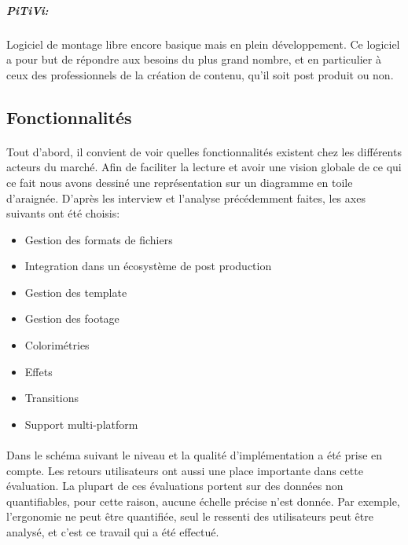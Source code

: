 \subparagraph{PiTiVi:}

Logiciel de montage libre encore basique mais en plein développement.
Ce logiciel a pour but de répondre aux besoins du plus grand nombre,
et en particulier à ceux des professionnels de la création de contenu,
qu'il soit post produit ou non.


\subsection{Fonctionnalités}

\paragraph{}

Tout d'abord, il convient de voir quelles fonctionnalités existent
chez les différents acteurs du marché. Afin de faciliter la lecture
et avoir une vision globale de ce qui ce fait nous avons dessiné une
représentation sur un diagramme en toile d'araignée.  D'après les
interview et l'analyse précédemment faites, les axes suivants ont
été choisis:

\begin{itemize} \setlength{\itemsep}{2mm}

  \item{Gestion des formats de fichiers}

  \item{Integration dans un écosystème de post production}

  \item{Gestion des template}

  \item{Gestion des footage}

  \item{Colorimétries}

  \item{Effets}

  \item{Transitions}

  \item{Support multi-platform}

\end {itemize}

\paragraph{}

Dans le schéma suivant le niveau et la qualité
d'implémentation a été prise en compte. Les retours utilisateurs
ont aussi une place importante dans cette évaluation. La plupart de
ces évaluations portent sur des données non quantifiables, pour cette
raison, aucune échelle précise n'est donnée.  Par exemple, l'ergonomie
ne peut être quantifiée, seul le ressenti des utilisateurs peut être
analysé, et c'est ce travail qui a été effectué.

